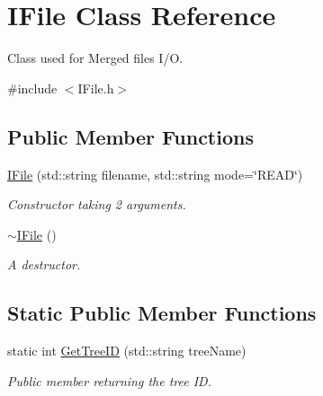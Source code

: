 \hypertarget{classIFile}{}\section{I\+File Class Reference}
\label{classIFile}


Class used for Merged files I/O.  




{\ttfamily \#include $<$I\+File.\+h$>$}

\subsection*{Public Member Functions}
\begin{DoxyCompactItemize}
\item 
\hyperlink{classIFile_af289b51cd89f7e858cedc3b996883be1}{I\+File} (std\+::string filename, std\+::string mode=\char`\"{}R\+E\+AD\char`\"{})
\begin{DoxyCompactList}\small\item\em Constructor taking 2 arguments. \end{DoxyCompactList}\item 
\mbox{\label{classIFile_a76f15a1ef952c31f9622263591e3150c}} 
\hyperlink{classIFile_a76f15a1ef952c31f9622263591e3150c}{$\sim$\+I\+File} ()
\begin{DoxyCompactList}\small\item\em A destructor. \end{DoxyCompactList}\end{DoxyCompactItemize}
\subsection*{Static Public Member Functions}
\begin{DoxyCompactItemize}
\item 
static int \hyperlink{classIFile_a467351b7318960864d75018f2a3b8466}{Get\+Tree\+ID} (std\+::string tree\+Name)
\begin{DoxyCompactList}\small\item\em Public member returning the tree ID. \end{DoxyCompactList}\end{DoxyCompactItemize}
